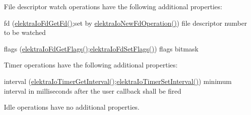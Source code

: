 File descriptor watch operations have the following additional properties\+:
\begin{DoxyItemize}
\item fd (\mbox{\hyperlink{io_8c_a7dec6afadd09f6350f9ad642906fc88a}{elektra\+Io\+Fd\+Get\+Fd()}};set by \mbox{\hyperlink{io_8c_a3804183da1aecdfcf09455d246c3891c}{elektra\+Io\+New\+Fd\+Operation()}}) file descriptor number to be watched
\item flags (\mbox{\hyperlink{io_8c_a8e2d356be0d89af3e46ebc8ce675db37}{elektra\+Io\+Fd\+Get\+Flags()}};\mbox{\hyperlink{io_8c_a1fd34686b0b3b1db5f460ea8c40ba5a8}{elektra\+Io\+Fd\+Set\+Flags()}}) flags bitmask
\end{DoxyItemize}

Timer operations have the following additional properties\+:
\begin{DoxyItemize}
\item interval (\mbox{\hyperlink{io_8c_abc383110a8cb712a0a35b958b4e446ea}{elektra\+Io\+Timer\+Get\+Interval()}};\mbox{\hyperlink{io_8c_a3e317e4c6e5869f296261c24312507ed}{elektra\+Io\+Timer\+Set\+Interval()}}) minimum interval in milliseconds after the user callback shall be fired
\end{DoxyItemize}

Idle operations have no additional properties.

